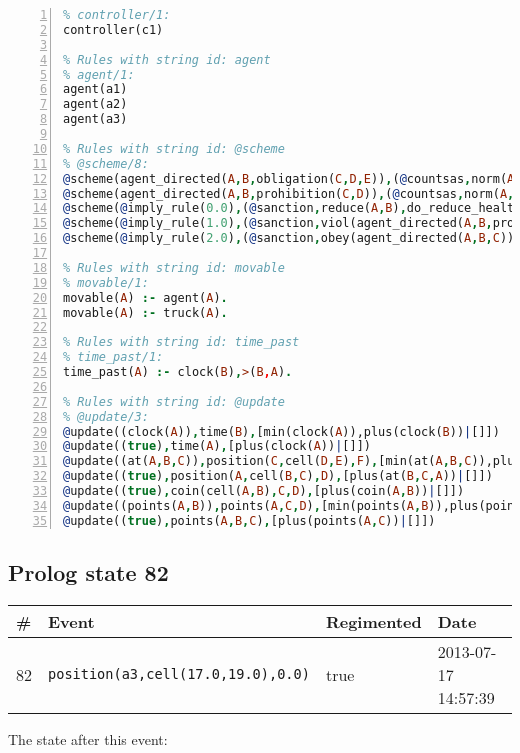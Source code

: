 \documentclass[11pt]{article}\usepackage[utf8]{inputenc}\usepackage{geometry}
\begin{document}
\begin{lstlisting}[language=Prolog, numbers=left]
% Rules with string id: controller
% controller/1:
controller(c1)

% Rules with string id: agent
% agent/1:
agent(a1)
agent(a2)
agent(a3)

% Rules with string id: @scheme
% @scheme/8:
@scheme(agent_directed(A,B,obligation(C,D,E)),(@countsas,norm(A,B,F,obligation(C,D,E)),F),false,(listTrue(C)),(time_past(D)),false,[plus(viol(agent_directed(A,B,obligation(C,D,E))))|[]],[plus(obey(agent_directed(A,B,obligation(C,D,E))))|[]])
@scheme(agent_directed(A,B,prohibition(C,D)),(@countsas,norm(A,B,E,prohibition(C,D)),E),(listTrue(C)),false,(false),false,[plus(viol(agent_directed(A,B,prohibition(C,D))))|[]],[plus(obey(agent_directed(A,B,prohibition(C,D))))|[]])
@scheme(@imply_rule(0.0),(@sanction,reduce(A,B),do_reduce_health(A,B),notifyAgent(A,changed(status))),true,false,false,false,[min(reduce(A,B))|[]],[])
@scheme(@imply_rule(1.0),(@sanction,viol(agent_directed(A,B,prohibition(C,D))),do_sanction(D)),true,false,false,false,[min(viol(agent_directed(A,B,prohibition(C,D))))|[]],[])
@scheme(@imply_rule(2.0),(@sanction,obey(agent_directed(A,B,C))),true,false,false,false,[min(obey(agent_directed(A,B,C)))|[]],[])

% Rules with string id: movable
% movable/1:
movable(A) :- agent(A).
movable(A) :- truck(A).

% Rules with string id: time_past
% time_past/1:
time_past(A) :- clock(B),>(B,A).

% Rules with string id: @update
% @update/3:
@update((clock(A)),time(B),[min(clock(A)),plus(clock(B))|[]])
@update((true),time(A),[plus(clock(A))|[]])
@update((at(A,B,C)),position(C,cell(D,E),F),[min(at(A,B,C)),plus(at(D,E,C))|[]])
@update((true),position(A,cell(B,C),D),[plus(at(B,C,A))|[]])
@update((true),coin(cell(A,B),C,D),[plus(coin(A,B))|[]])
@update((points(A,B)),points(A,C,D),[min(points(A,B)),plus(points(A,D))|[]])
@update((true),points(A,B,C),[plus(points(A,C))|[]])

\end{lstlisting}
\clearpage 
\subsection{Prolog state 82}
\begin{table}[ht]
\centering 
\begin{tabular}{l l l l} 
\textbf{\#} & \textbf{Event} & \textbf{Regimented} & \textbf{Date} \\ [0.5ex] 
\hline
82&\texttt{position(a3,cell(17.0,19.0),0.0)}&true&2013-07-17 14:57:39\\ [1ex] \hline\end{tabular}
\end{table}
The state after this event:
\end{document}
